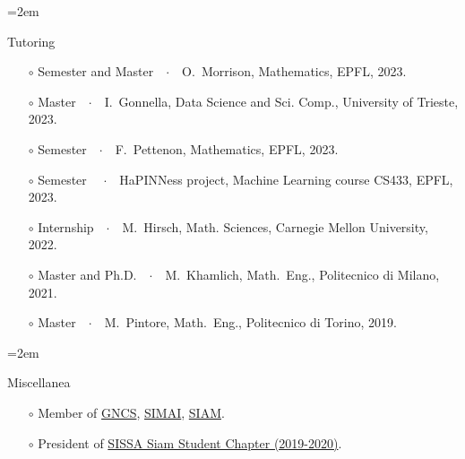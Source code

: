 \documentclass{scrartcl}
\newcommand{\Description}[1]{\hangindent=2em\hangafter=0\noindent\raggedright\footnotesize{#1}\par\normalsize\vspace{1em}} %
\begin{document}
\begin{cv}{}
\Description{{\color{cyan} Tutoring}
\begin{itemize}
    \item[$\circ$] {\color{NavyBlue}Semester} and {\color{PineGreen}Master}\ \ $\cdotp$\ \  O.\ Morrison, Mathematics, EPFL, 2023.
    \item[$\circ$] {\color{PineGreen}Master}\ \ $\cdotp$\ \  I.\ Gonnella, Data Science and Sci. Comp., University of Trieste, 2023.
    \item[$\circ$] {\color{NavyBlue}Semester}\ \ $\cdotp$\ \  F.\ Pettenon, Mathematics, EPFL, 2023.
    \item[$\circ$] {\color{NavyBlue}Semester} \ \ $\cdotp$\ \ HaPINNess project, Machine Learning course CS433, EPFL, 2023.
    \item[$\circ$] {\color{NavyBlue}Internship}\ \ $\cdotp$\ \ M.\ Hirsch, Math. Sciences, Carnegie Mellon University, 2022.
    \item[$\circ$] {\color{PineGreen}Master} and {\color{BrickRed}Ph.D.}\ \ $\cdotp$\ \  M.\ Khamlich, Math.\ Eng., Politecnico di Milano, 2021.
    \item[$\circ$] {\color{PineGreen}Master}\ \ $\cdotp$\ \  M.\ Pintore, Math.\ Eng., Politecnico di Torino, 2019.
\end{itemize}}
\vspace{-0.5em}
\Description{{\color{cyan} Miscellanea}
\begin{itemize}
    \item[$\circ$] Member of \href{https://www.altamatematica.it/gncs/}{GNCS}, \href{https://www.simai.eu}{SIMAI}, \href{https://www.siam.org}{SIAM}.
    \item[$\circ$] President of \href{http://www.math.sissa.it/content/sissa-siam-student-chapter}{SISSA Siam Student Chapter (2019-2020)}.

\end{itemize}}
\end{cv}
\end{document}
